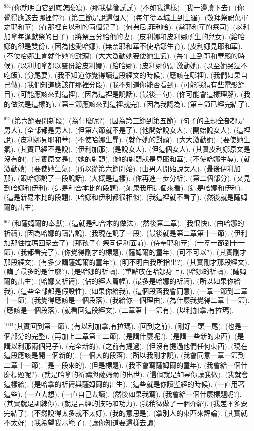 \documentclass{book}
\begin{document}
$^{881}$(你就明白它到底怎麼寫).
(那我儘管試試).
(不如我這樣).
(我一邊讀下去).
(你覺得應該去哪裡停?).
(第三節是說這個人).
(每年從本城上到士羅).
(敬拜祭祀萬軍之耶和華).
(在那裡有以利的兩個兒子).
(何弗尼,菲利哈).
(當耶和華的祭司).
(以利加拿每逢獻祭的日子).
(將祭玉分給他的妻).
(皮利娜和皮利娜所生的兒女).
(給哈娜的卻是雙份).
(因為他愛哈娜).
(無奈耶和華不使哈娜生育).
(皮利娜見耶和華).
(不使哈娜生育就作她的對頭).
(大大激動她要使她生氣).
(每年上到耶和華殿的時候).
(以利加拿都以雙份給皮利娜).
(給哈娜).
(皮利娜仍是激動她).
(以至她哭泣不吃飯).
(分尾要).
(我不知道你覺得讀這段經文的時候).
(應該在哪裡).
(我們如果自己做).
(我們知道應該在那裡分段).
(我不知道你能否看到).
(可能我猜有些電影節目).
(可能應該來到這裡).
(因為這裡是說話).
(最後一句).
(你可能會這樣理解).
(我的做法是這樣的).
(第三節應該來到這裡就完).
(因為我認為).
(第三節已經完結了).

$^{921}$(第六節要開新段).
(為什麼呢?).
(因為第三節到第五節).
(句子的主題全部都是男人).
(全部都是男人).
(但第六節就不是了).
(他開始說女人).
(開始說女人).
(這裡說).
(皮利娜見耶和華).
(不使哈娜生辱).
(就作她的對頭).
(大大激動她).
(要使她生氣).
(其實已經不是說).
(伊利加那).
(是說女人).
(但這個女人).
(其實皮利娜原文是沒有的).
(其實原文是).
(她的對頭).
(她的對頭就是見耶和華).
(不使哈娜生辱).
(就激動她).
(要使她生氣).
(所以從第六節開始).
(由男人開始說女人).
(最後伊利加那).
(跟哈娜說了一段說話).
(大概是這樣).
(你再進一步分析).
(第二個部分).
(又見到哈娜和伊利).
(這是和合本比的段題).
(如果我用這個來看).
(這是哈娜和伊利).
(這是新易本比的段題).
(哈娜和伊利都很相似).
(我這裡就不看了).
(然後就是薩姆爾的出生).

$^{961}$(和薩姆爾的奉獻).
(這就是和合本的做法).
(然後第二章).
(我很快).
(由哈娜的祈禱).
(因為哈娜的禱告說).
(我現在說了一段).
(最後就是第二章第十一節).
(伊利加那往拉瑪回家去了).
(那孩子在祭司伊利面前).
(侍奉耶和華).
(一章一節到十一節).
(我都看完了).
(你覺得剛才的標題).
(薩姆爾的童年).
(可不可以?).
(其實剛才那段經文).
(有多少講薩姆爾的童年?).
(明不明白我所指出?).
(其實剛才那段經文).
(講了最多的是什麼?).
(是哈娜的祈禱).
(重點放在哈娜身上).
(哈娜的祈禱).
(薩姆爾的出生).
(哈娜又祈禱).
(佔的經人篇幅).
(最多是哈娜的祈禱).
(所以如果你給我).
(這些全部都是假設性).
(如果你給我).
(這個段落我會同意).
(一章一節到二章十一節).
(我覺得應該是一個段落).
(我給你一個理由).
(為什麼我覺得二章十一節).
(應該是一個段落).
(就看回這段經文).
(二章第十一節有).
(以利加拿,有拉瑪).

$^{1001}$(其實回到第一節).
(有以利加拿,有拉瑪).
(回到之前).
(剛好一頭一尾).
(也是一個部分的完整).
(再加上二章第十二節).
(是講什麼呢?).
(是講一些新的東西).
(是講以利那兩個兒子).
(完全新的).
(之前有提過).
(但沒有提過他們任何東西).
(現在這段應該是開一個新的).
(一個大的段落).
(所以我剛才說).
(我會同意一章一節到二章十一節).
(是一段來的).
(但是標題).
(我不會寫薩姆爾的童年).
(我會給一個什麼標題呢?).
(就是哈拿的祈禱與薩姆爾的出世).
(這個就是如果你讓我做).
(我就會這樣給).
(是哈拿的祈禱與薩姆爾的出生).
(這些就是你讀聖經的時候).
(一直用著這些).
(一直去想).
(一直自己去讀).
(然後如果我寫).
(我會給一個什麼標題呢?).
(其實就是訓練你).
(就是言經的技巧和功力).
(我稍微做了一個介紹).
(我差不多要完結了).
(不然說得太多就不太好).
(我的意思是).
(拿別人的東西來評論).
(其實就不太好).
(我希望我示範了).
(讓你知道要這樣去讀).
\end{document}
